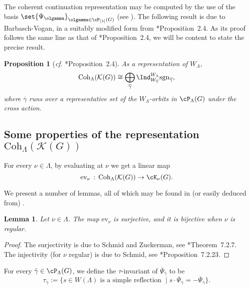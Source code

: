 \documentclass[12pt,a4paper]{amsart}
\newcommand{\CK}{{\mathcal {K}}}
\numberwithin{equation}{section}
\newtheorem{lem}[thm]{Lemma}
\newtheorem{prop}[thm]{Proposition}
\theoremstyle{remark}
\def\cf{\emph{cf.} }
\def\Irr{\mathrm{Irr}}
\def\Coh{\mathrm{Coh}}
\newcommand{\Lam}{{[\lambda]}}
\newcommand{\Grt}{\cK}
\begin{document}
The coherent continuation representation may be computed by the use of the basis  $\set{\Psi_{\olgamma}}_{\olgamma\in \cP_{\Lam}(G)}$ (see \cite[Section 14]{V4}).
The following result is due to Barbasch-Vogan, in a suitably modified form from \cite{BV.W}*{Proposition~2.4}. As its proof follows the same line as that of \cite{BV.W}*{Proposition~2.4}, we will be content to state the precise result.


\begin{prop}[{\cf \cite{BV.W}*{Proposition~2.4}}]
  \label{thm:cohHC}
As a representation of $W_{\Lambda}$,
  \[
    \Coh_{\Lambda}(\CK(G)) \cong \bigoplus_{\overline \gamma}
    \Ind_{W_{\overline \gamma}}^{W_{\Lambda}}  \mathrm{sgn}_{\overline \gamma},
  \]
  where $\overline \gamma$ runs over a representative set of the $W_{\Lambda}$-orbits
  in $\cP_{\Lambda}(G)$ under the cross action.
\end{prop}



\subsection{Some properties of the representation $\Coh_{\Lambda}(\CK(G))$}


For every $\nu\in \Lambda$, by evaluating at $\nu$ we get a linear map
   \[
    \mathrm{ev}_{\nu } \, :\,  \Coh_{\Lambda}(\CK(G)) \rightarrow \Grt_{\nu}(G).
  \]

We present a number of lemmas, all of which may be found in (or easily deduced from) \cite{Vg,V4}.

 \begin{lem}\label{lem21}
Let  $\nu\in \Lambda$. The map  $\mathrm{ev}_{\nu}$ is surjective, and it is bijective when $\nu$ is regular.
     \end{lem}
\begin{proof}
The surjectivity is due to Schmid and Zuckerman, see  \cite{Vg}*{Theorem~7.2.7}. The injectivity (for $\nu$ regular)  is due to Schmid, see \cite{Vg}*{Proposition~7.2.23}.
\end{proof}

For every $\bar \gamma\in \cP_\Lambda(G)$,  we define the $\tau$-invariant of  $ \overline \Psi_{\bar \gamma}$ to be
\[
  \tau_{\bar\gamma}:=\{s\in W(\Lambda) \textrm{ is a simple reflection }\mid   s\cdot \overline \Psi_{\bar \gamma}=-\overline \Psi_{\bar \gamma}\}.
\]
\end{document}
